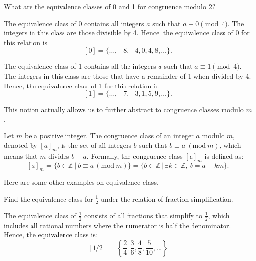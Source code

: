 \begin{example}
	What are the equivalence classes of 0 and 1 for congruence modulo 2?
\end{example}
\begin{solution}
	The equivalence class of 0 contains all integers \( a \) such that \( a \equiv 0 \pmod{4} \). The integers in this class are those divisible by 4. Hence, the equivalence class of 0 for this relation is
	\[ [0] = \{ \ldots, -8, -4, 0, 4, 8, \ldots \}. \]
	
	The equivalence class of 1 contains all the integers \( a \) such that \( a \equiv 1 \pmod{4} \). The integers in this class are those that have a remainder of 1 when divided by 4. Hence, the equivalence class of 1 for this relation is
	\[ [1] = \{ \ldots, -7, -3, 1, 5, 9, \ldots \}. \]
\end{solution}

This notion actually allows us to further abstract to congruence classes modulo $m$.
\begin{definition}
	Let \( m \) be a positive integer. The congruence class of an integer \( a \) modulo \( m \), denoted by \( [a]_m \), is the set of all integers \( b \) such that \( b \equiv a \ (\mathrm{mod} \ m) \), which means that \( m \) divides \( b - a \). Formally, the congruence class \( [a]_m \) is defined as:
	\[ [a]_m = \{ b \in \mathbb{Z} \ | \ b \equiv a \ (\mathrm{mod} \ m) \} = \{ b \in \mathbb{Z} \ | \ \exists k \in \mathbb{Z}, \ b = a + km \}. \]
\end{definition}

Here are some other examples on equivalence class.
\begin{example}
	Find the equivalence class for \( \frac{1}{2} \) under the relation of fraction simplification.
\end{example}

\begin{solution}
	The equivalence class of \( \frac{1}{2} \) consists of all fractions that simplify to \( \frac{1}{2} \), which includes all rational numbers where the numerator is half the denominator. Hence, the equivalence class is:
	\[ [1/2] = \left\{ \frac{2}{4}, \frac{3}{6}, \frac{4}{8}, \frac{5}{10}, \ldots \right\} \]
\end{solution}

